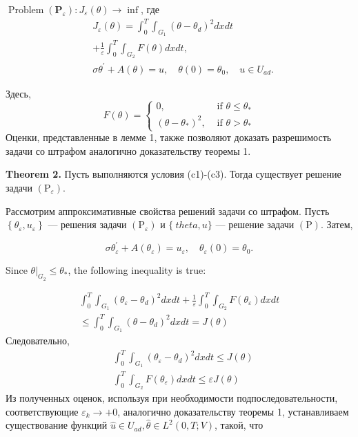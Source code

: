 $\operatorname{Problem}\left(\mathbf{P}_{\varepsilon}\right): J_{\varepsilon}(\theta) \rightarrow \inf$,
где
\[
    \begin{aligned}
        & J_{\varepsilon}(\theta)=\int_{0}^{T} \int_{G_{1}}\left(\theta-\theta_{d}\right)^{2} d x d t \\
        & +\frac{1}{\varepsilon} \int_{0}^{T} \int_{G_{2}} F(\theta) d x d t, \\
        & \sigma \theta^{\prime}+A(\theta)=u, \quad \theta(0)=\theta_{0}, \quad u \in U_{a d} .
    \end{aligned}
\]

Здесь,
\[
    F(\theta)= \begin{cases}
                   0, & \text { if } \theta \leq \theta_{*} \\
                   \left(\theta-\theta_{*}\right)^{2}, & \text { if } \theta>\theta_{*}
    \end{cases}
\]
Оценки, представленные в лемме 1, также позволяют доказать разрешимость
задачи со штрафом аналогично доказательству теоремы 1.

\textbf{Theorem 2.}
Пусть выполняются условия (c1)-(c3).
Тогда существует решение задачи $\left(\mathrm{P}_{\varepsilon}\right)$.

Рассмотрим аппроксимативные свойства решений задачи со штрафом.
Пусть $\left\{\theta_{\varepsilon}, u_{\varepsilon}\right\}$ — решения задачи
$\left(\mathrm{P}_{\varepsilon}\right)$ и $\{\ theta, u\}$
— решение задачи $(\mathrm{P})$.
Затем,

\[
    \sigma \theta_{\varepsilon}^{\prime}+A\left(\theta_{\varepsilon}\right)=u_{\varepsilon},
    \quad \theta_{\varepsilon}(0)=\theta_{0} .
\]

Since $\left.\theta\right|_{G_{2}} \leq \theta_{*}$, the following inequality is true:

\[
    \begin{array}{r}
        \int_{0}^{T} \int_{G_{1}}\left(\theta_{\varepsilon}-\theta_{d}\right)^{2} d x d t+\frac{1}{\varepsilon}
        \int_{0}^{T} \int_{G_{2}} F\left(\theta_{\varepsilon}\right) d x d t \\
        \leq \int_{0}^{T} \int_{G_{1}}\left(\theta-\theta_{d}\right)^{2} d x d t=J(\theta)
    \end{array}
\]
Следовательно,
\[
    \begin{aligned}
        &\int_{0}^{T} \int_{G_{1}}\left(\theta_{\varepsilon}-\theta_{d}\right)^{2} d x d t \leq J(\theta) \\
        &\int_{0}^{T} \int_{G_{2}} F\left(\theta_{\varepsilon}\right) d x d t \leq \varepsilon J(\theta)
    \end{aligned}
\]
Из полученных оценок, используя при необходимости подпоследовательности,
соответствующие $\varepsilon_{k} \rightarrow+0$,
аналогично доказательству теоремы 1, устанавливаем существование
функций $\widehat{u} \in U_{a d}, \widehat{\theta} \in L^{2}(0, T ; V)$, такой, что

